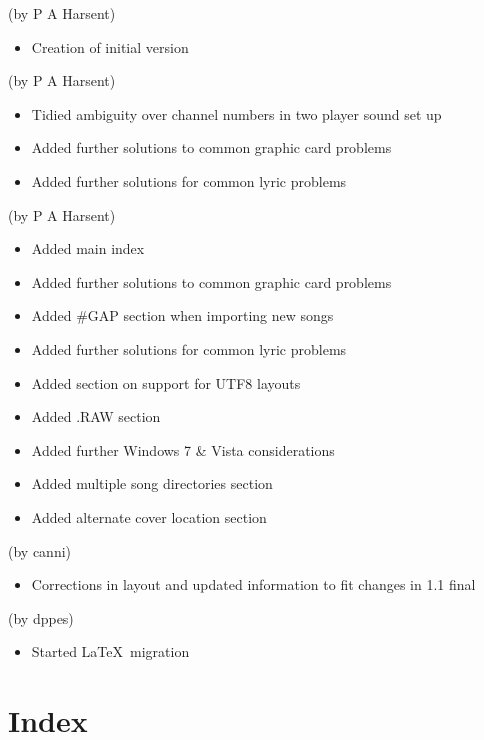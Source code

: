 \documentclass{scrreprt}
\begin{document}
\newenvironment*{version}[2]{%
	\item[#1] (by #2)
	\begin{itemize}[nosep, noitemsep]
}{%
	\end{itemize}
}
\begin{description}
\begin{version}{2010-09-24}{P A Harsent}
\item Creation of initial version
\end{version}
\begin{version}{2010-10-02}{P A Harsent}
\item Tidied ambiguity over channel numbers in two player sound set up
\item Added further solutions to common graphic card problems
\item Added further solutions for common lyric problems
\end{version}
\begin{version}{2010-10-09}{P A Harsent}
\item Added main index
\item Added further solutions to common graphic card problems
\item Added \#GAP section when importing new songs
\item Added further solutions for common lyric problems
\item Added section on support for UTF8 layouts
\item Added .RAW section
\item Added further Windows 7 \& Vista considerations
\item Added multiple song directories section
\item Added alternate cover location section
\end{version}
\begin{version}{2010-10-10}{canni}
\item Corrections in layout and updated information to fit changes in 1.1 final
\end{version}
\begin{version}{2019-12-23}{dppes}
\item Started \LaTeX\ migration
\end{version}
\end{description}

\chapter{Index}
\end{document}
